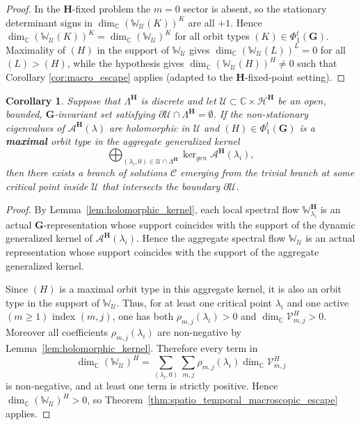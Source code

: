 \documentclass[twoside,11pt]{article}
\def\bc{{\mathbb{C}}}
\newtheorem{corollary}[theorem]{Corollary}
\begin{document}
\begin{proof}
In the $\bm H$-fixed problem the $m=0$ sector is absent, so the stationary determinant signs in $\dim_\bc \left(\mathbb W_{\mathcal U}(K) \right)^K$ are all $+1$. Hence $\dim_\bc \left(\mathbb W_{\mathcal U}(K) \right)^K=\dim_\bc(\mathbb W_{\mathcal U})^K$ for all orbit types $(K) \in \Phi_1^t(\bm G)$.
Maximality of $(H)$ in the support of $\mathbb W_{\mathcal U}$ gives $\dim_\bc \left(\mathbb W_{\mathcal U}(L) \right)^L=0$ for all $(L)>(H)$, while the hypothesis gives $\dim_\bc \left(\mathbb W_{\mathcal U}(H) \right)^H\neq0$ such that Corollary \ref{cor:macro_escape} applies (adapted to the $\bm H$-fixed-point setting).
\end{proof}


\begin{corollary}\label{cor:spatio_temporal_holomorphic_escape}
Suppose that $\Lambda^{\bm H}$ is discrete and let $\mathcal{U} \subset \bc \times \mathscr{H}^{\bm{H}}$ be an open, bounded, $\bm{G}$-invariant set satisfying $\partial \mathcal{U} \cap \Lambda^{\bm{H}} = \emptyset$. If the non-stationary eigenvalues of $\mathscr{A}^{\bm{H}}(\lambda)$ are holomorphic in $\mathcal{U}$ and $(H) \in \Phi_1^t(\bm{G})$ is a \textbf{maximal} orbit type in the aggregate generalized kernel
\[
\bigoplus_{(\lambda_i,0) \in \mathcal{U} \cap \Lambda^{\bm H}} \ker\nolimits_{gen}\mathscr{A}^{\bm{H}}(\lambda_i),
\]
then there exists a branch of solutions $\mathscr C$ emerging from the trivial branch at some critical point inside $\mathcal{U}$ that intersects the boundary $\partial \mathcal{U}$.
\end{corollary}
\begin{proof}
By Lemma~\ref{lem:holomorphic_kernel}, each local spectral flow
$\mathbb W_{\lambda_i}^{\bm H}$ is an actual $\bm G$-representation whose
support coincides with the support of the dynamic generalized kernel of
$\mathscr A^{\bm H}(\lambda_i)$. Hence the aggregate spectral flow
$\mathbb W_{\mathcal U}$ is an actual representation whose support coincides
with the support of the aggregate generalized kernel.

Since $(H)$ is a maximal orbit type in this aggregate kernel, it is also an orbit type in the support of $\mathbb W_{\mathcal U}$. Thus, for at least one critical point $\lambda_i$ and one active $(m \geq 1)$ index $(m,j)$, one has both $\rho_{m,j}(\lambda_i)>0$ and $\dim_\bc \mathcal V_{m,j}^H>0$. Moreover all coefficients $\rho_{m,j}(\lambda_i)$ are non-negative by
Lemma~\ref{lem:holomorphic_kernel}. Therefore every term in
\[
\dim_\bc(\mathbb W_{\mathcal U})^H
=
\sum_{(\lambda_i,0)}
\sum_{m,j}
\rho_{m,j}(\lambda_i)\dim_\bc\mathcal V_{m,j}^H
\]
is non-negative, and at least one term is strictly positive. Hence
$\dim_\bc(\mathbb W_{\mathcal U})^H>0$, so Theorem~\ref{thm:spatio_temporal_macroscopic_escape}
applies.
\end{proof}
\end{document}
